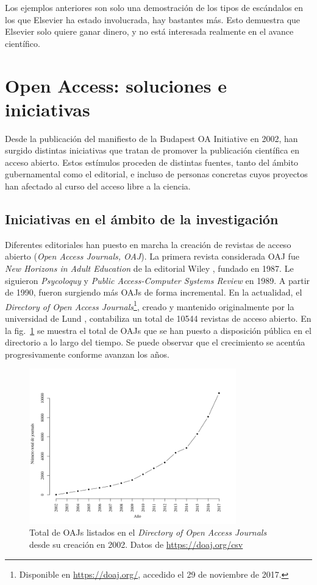 Los ejemplos anteriores son solo una demostración de los tipos de escándalos en los que Elsevier ha estado involucrada, hay bastantes más. Esto demuestra que Elsevier solo quiere ganar dinero, y no está interesada realmente en el avance científico.

\section{Open Access: soluciones e iniciativas}\label{iniciativas}

Desde la publicación del manifiesto de la Budapest OA Initiative \cite{boai} en 2002, han surgido distintas iniciativas que tratan de promover la publicación científica en acceso abierto. Estos estímulos proceden de distintas fuentes, tanto del ámbito gubernamental como el editorial, e incluso de personas concretas cuyos proyectos han afectado al curso del acceso libre a la ciencia.

\subsection{Iniciativas en el ámbito de la investigación}

Diferentes editoriales han puesto en marcha la creación de revistas de acceso abierto (\textit{Open Access Journals, OAJ}). La primera revista considerada OAJ fue \textit{New Horizons in Adult Education} de la editorial Wiley \cite{earlyoaj}, fundado en 1987. Le siguieron \textit{Psycoloquy} y \textit{Public Access-Computer Systems Review} en 1989. A partir de 1990, fueron surgiendo más OAJs de forma incremental. En la actualidad, el \textit{Directory of Open Access Journals}\footnote{Disponible en \url{https://doaj.org/}, accedido el 29 de noviembre de 2017.}, creado y mantenido originalmente por la universidad de Lund \cite{nordic}, contabiliza un total de 10544 revistas de acceso abierto. En la fig.~\ref{fig:doaj} se muestra el total de OAJs que se han puesto a disposición pública en el directorio a lo largo del tiempo. Se puede observar que el crecimiento se acentúa progresivamente conforme avanzan los años.

\begin{figure}[htbp]
  \centering
  \includegraphics[width=0.8\textwidth]{doaj_years.png}
  \caption{\label{fig:doaj}Total de OAJs listados en el \textit{Directory of Open Access Journals} desde su creación en 2002. Datos de \url{https://doaj.org/csv}}

\end{figure}

